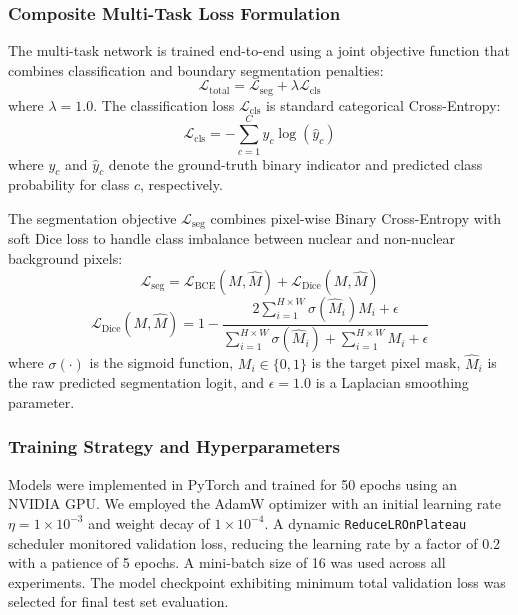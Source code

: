 \documentclass[pdflatex,sn-nature]{sn-jnl}%
\theoremstyle{thmstyleone}%
\theoremstyle{thmstyletwo}%
\theoremstyle{thmstylethree}%
\begin{document}
\subsubsection{Composite Multi-Task Loss Formulation}
The multi-task network is trained end-to-end using a joint objective function that combines classification and boundary segmentation penalties:
\begin{equation}
    \mathcal{L}_{\text{total}} = \mathcal{L}_{\text{seg}} + \lambda \mathcal{L}_{\text{cls}}
\end{equation}
where $\lambda = 1.0$. The classification loss $\mathcal{L}_{\text{cls}}$ is standard categorical Cross-Entropy:
\begin{equation}
    \mathcal{L}_{\text{cls}} = - \sum_{c=1}^{C} y_c \log(\hat{y}_c)
\end{equation}
where $y_c$ and $\hat{y}_c$ denote the ground-truth binary indicator and predicted class probability for class $c$, respectively. 

The segmentation objective $\mathcal{L}_{\text{seg}}$ combines pixel-wise Binary Cross-Entropy with soft Dice loss to handle class imbalance between nuclear and non-nuclear background pixels:
\begin{equation}
    \mathcal{L}_{\text{seg}} = \mathcal{L}_{\text{BCE}}(M, \hat{M}) + \mathcal{L}_{\text{Dice}}(M, \hat{M})
\end{equation}
\begin{equation}
    \mathcal{L}_{\text{Dice}}(M, \hat{M}) = 1 - \frac{2 \sum_{i=1}^{H \times W} \sigma(\hat{M}_i) M_i + \epsilon}{\sum_{i=1}^{H \times W} \sigma(\hat{M}_i) + \sum_{i=1}^{H \times W} M_i + \epsilon}
\end{equation}
where $\sigma(\cdot)$ is the sigmoid function, $M_i \in \{0, 1\}$ is the target pixel mask, $\hat{M}_i$ is the raw predicted segmentation logit, and $\epsilon = 1.0$ is a Laplacian smoothing parameter.

\subsubsection{Training Strategy and Hyperparameters}
Models were implemented in PyTorch and trained for 50 epochs using an NVIDIA GPU. We employed the AdamW optimizer with an initial learning rate $\eta = 1 \times 10^{-3}$ and weight decay of $1 \times 10^{-4}$. A dynamic \texttt{ReduceLROnPlateau} scheduler monitored validation loss, reducing the learning rate by a factor of 0.2 with a patience of 5 epochs. A mini-batch size of 16 was used across all experiments. The model checkpoint exhibiting minimum total validation loss was selected for final test set evaluation.
\end{document}
